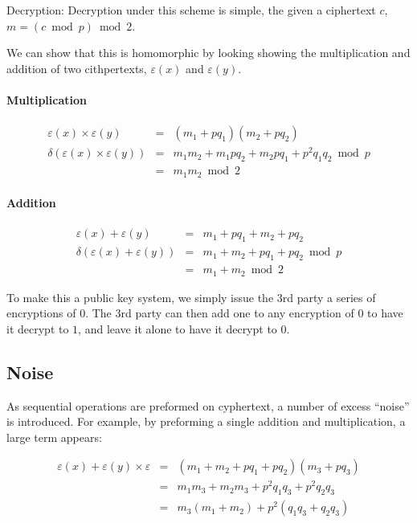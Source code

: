 \documentclass[a4paper,10pt]{article}
\begin{document}
Decryption: Decryption under this scheme is simple, the given a
ciphertext $c$, $ m = ( c \bmod p) \bmod 2 $.

We can show that this is homomorphic by looking showing the
multiplication and addition of two cithpertexts, $ \varepsilon(x) $
and $ \varepsilon(y) $.

\paragraph{Multiplication}
\begin{eqnarray*}
\varepsilon(x) \times \varepsilon(y) &=& (m_1 + p q_1)(m_2 + p q_2)\\
\delta(\varepsilon(x) \times \varepsilon(y))&=& m_1m_2 + m_1pq_2 + m_2pq_1 + p^2q_1q_2 \bmod p\\
&=& m_1m_2 \bmod 2
\end{eqnarray*}

\paragraph{Addition}
\begin{eqnarray*}
\varepsilon(x) + \varepsilon(y) &=& m_1 + p q_1 + m_2 + p q_2\\
\delta(\varepsilon(x) + \varepsilon(y))&=& m_1 + m_2 + pq_1 + pq_2 \bmod p\\
&=& m_1 + m_2 \bmod 2
\end{eqnarray*}

To make this a public key system, we simply issue the 3rd party a
series of encryptions of $0$. The 3rd party can then add one to any
encryption of $0$ to have it decrypt to $1$, and leave it alone to
have it decrypt to $0$.

\subsection{Noise}
As sequential operations are preformed on cyphertext, a number of
excess ``noise'' is introduced. For example, by preforming a single
addition and multiplication, a large term appears:

\begin{eqnarray*}
\varepsilon(x) + \varepsilon(y) \times \varepsilon &=& (m_1 + m_2 + pq_1 + pq_2)(m_3 + pq_3)\\
&=&m_1m_3 + m_2m_3 + p^2q_1q_3 + p^2q_2q_3\\
&=&m_3(m_1 + m_2) + p^2(q_1q_3 + q_2q_3)
\end{eqnarray*}
\end{document}

